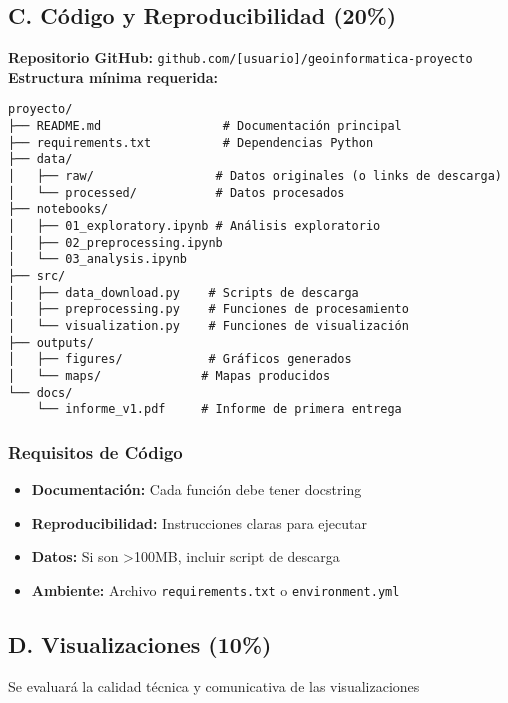 \documentclass[11pt,letterpaper]{article}
\begin{document}
\subsection{C. Código y Reproducibilidad (20\%)}

\begin{requirements}
\textbf{Repositorio GitHub:} \texttt{github.com/[usuario]/geoinformatica-proyecto} \\
\textbf{Estructura mínima requerida:}
\end{requirements}

\begin{verbatim}
proyecto/
├── README.md                 # Documentación principal
├── requirements.txt          # Dependencias Python
├── data/
│   ├── raw/                 # Datos originales (o links de descarga)
│   └── processed/           # Datos procesados
├── notebooks/
│   ├── 01_exploratory.ipynb # Análisis exploratorio
│   ├── 02_preprocessing.ipynb
│   └── 03_analysis.ipynb
├── src/
│   ├── data_download.py    # Scripts de descarga
│   ├── preprocessing.py    # Funciones de procesamiento
│   └── visualization.py    # Funciones de visualización
├── outputs/
│   ├── figures/            # Gráficos generados
│   └── maps/              # Mapas producidos
└── docs/
    └── informe_v1.pdf     # Informe de primera entrega
\end{verbatim}

\subsubsection{Requisitos de Código}

\begin{itemize}
    \item \textbf{Documentación:} Cada función debe tener docstring
    \item \textbf{Reproducibilidad:} Instrucciones claras para ejecutar
    \item \textbf{Datos:} Si son >100MB, incluir script de descarga
    \item \textbf{Ambiente:} Archivo \texttt{requirements.txt} o \texttt{environment.yml}
\end{itemize}

\subsection{D. Visualizaciones (10\%)}

\begin{evaluation}
Se evaluará la calidad técnica y comunicativa de las visualizaciones
\end{evaluation}
\end{document}
